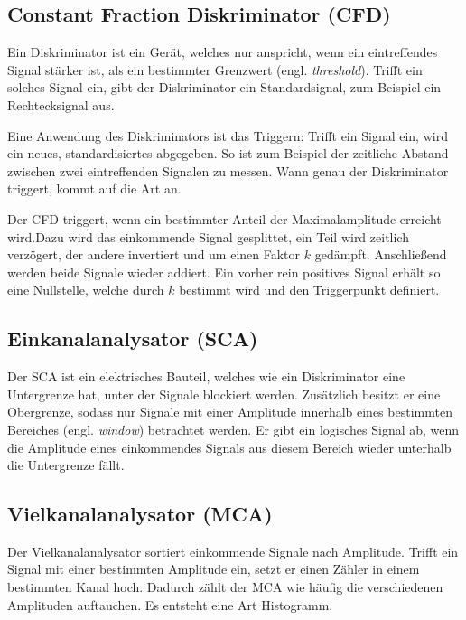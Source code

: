 
\subsection{Constant Fraction Diskriminator (CFD)}

Ein Diskriminator ist ein Gerät, welches nur anspricht, wenn ein eintreffendes
Signal stärker ist, als ein bestimmter Grenzwert (engl. \emph{threshold}).
Trifft ein solches Signal ein, gibt der Diskriminator ein Standardsignal, zum
Beispiel ein Rechtecksignal aus.

Eine Anwendung des Diskriminators ist das Triggern: Trifft ein Signal ein, wird
ein neues, standardisiertes abgegeben. So ist zum Beispiel der zeitliche
Abstand zwischen zwei eintreffenden Signalen zu messen. Wann genau der
Diskriminator triggert, kommt auf die Art an.

Der CFD triggert, wenn ein bestimmter Anteil der Maximalamplitude erreicht
wird.Dazu wird das einkommende Signal gesplittet, ein Teil wird zeitlich
verzögert, der andere invertiert und um einen Faktor $k$ gedämpft. Anschließend
werden beide Signale wieder addiert. Ein vorher rein positives Signal erhält so
eine Nullstelle, welche durch $k$ bestimmt wird und den Triggerpunkt definiert.

\subsection{Einkanalanalysator (SCA)}

Der SCA ist ein elektrisches Bauteil, welches wie ein Diskriminator eine
Untergrenze hat, unter der Signale blockiert werden. Zusätzlich besitzt er eine
Obergrenze, sodass nur Signale mit einer Amplitude innerhalb eines bestimmten
Bereiches (engl. \emph{window}) betrachtet werden. Er gibt ein logisches Signal
ab, wenn die Amplitude eines einkommendes Signals aus diesem Bereich wieder
unterhalb die Untergrenze fällt.

\subsection{Vielkanalanalysator (MCA)}

Der Vielkanalanalysator sortiert einkommende Signale nach Amplitude. Trifft ein
Signal mit einer bestimmten Amplitude ein, setzt er einen Zähler in einem
bestimmten Kanal hoch. Dadurch zählt der MCA wie häufig die verschiedenen
Amplituden auftauchen. Es entsteht eine Art Histogramm.

